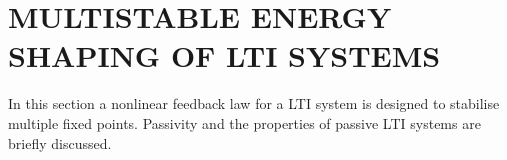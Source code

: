 
%

\clearpage

\section{MULTISTABLE ENERGY SHAPING OF LTI SYSTEMS}\label{sec:multistable}
%
%
In this section a nonlinear feedback law for a LTI system is designed to stabilise multiple fixed points. Passivity and the properties of passive LTI systems are briefly discussed.
